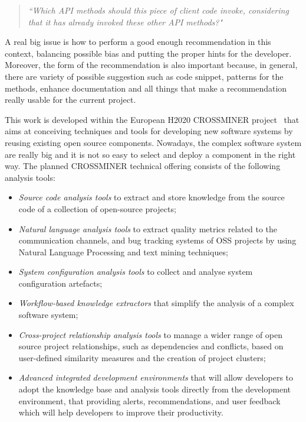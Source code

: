 \begin{quote}
	\textit{``Which API methods should this piece of client 
	code invoke, 
	considering that it has already invoked these other API 
	methods?"}
\end{quote}


A real big issue is how to perform a good enough 
recommendation in this 
context, balancing possible bias and putting the proper hints 
for the 
developer. Moreover, the form of the recommendation is also 
important because, 
in general, there are variety of possible suggestion such as 
code snippet, 
patterns for the methods, enhance documentation and all 
things that make a 
recommendation really usable for the current project. 

This work is developed within the European H2020 CROSSMINER 
project~\cite{CROSSMINER} that aims at conceiving techniques 
and tools for developing new software systems by reusing 
existing open source 
components. Nowadays, the complex software system are really 
big and it is not 
so easy to select and deploy a component in the right way. 
The planned 
CROSSMINER technical offering consists of the following 
analysis tools:

\begin{itemize}
	\item \textit{Source code analysis tools} to extract and 
	store knowledge from the 	source code of a collection of 
	open-source projects;
	\item \textit{Natural language analysis tools} to extract 
	quality metrics related to 	the communication channels, 
	and bug tracking systems of OSS projects by using Natural 
	Language Processing and text mining techniques;
	\item \textit{System configuration analysis tools} to 
	collect and analyse system 	configuration artefacts;
	\item \textit{Workflow-based knowledge extractors} that 
	simplify the analysis of a complex software system;
	\item \textit{Cross-project relationship analysis tools} 
	to manage a wider range of open source project 
	relationships, such as dependencies and conflicts, 
	based on user-defined similarity measures and the 
	creation of project clusters;
	\item \textit{Advanced integrated development 
	environments} that will allow developers to adopt the  
	knowledge base and analysis tools directly from the 
	development environment, that providing alerts, 
	recommendations, and user feedback which will help 
	developers to improve their productivity.
\end{itemize}


